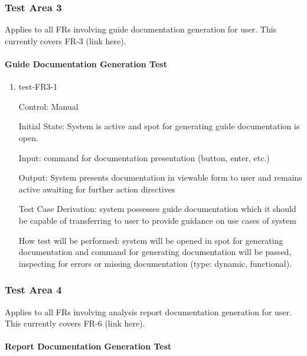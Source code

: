 \documentclass[12pt, titlepage]{article}
\begin{document}
\subsubsection{Test Area 3}

Applies to all FRs involving guide documentation generation for user. This 
currently covers FR-3 (link here).

\paragraph{Guide Documentation Generation Test}

\begin{enumerate}

\item{test-FR3-1\\}

Control: Manual
					
Initial State: System is active and spot for generating guide documentation is 
open.
					
Input: command for documentation presentation (button, enter, etc.)
					
Output: System presents documentation in viewable form to user and remains 
active awaiting for further action directives

Test Case Derivation: system possesses guide documentation which it should be 
capable of transferring to user to provide guidance on use cases of system

How test will be performed: system will be opened in spot for generating 
documentation and command for generating documentation will be passed, 
inspecting for errors or missing documentation (type: dynamic, functional).				

\end{enumerate}

\subsubsection{Test Area 4}

Applies to all FRs involving analysis report documentation generation for 
user. This currently covers FR-6 (link here).

\paragraph{Report Documentation Generation Test}
\end{document}
